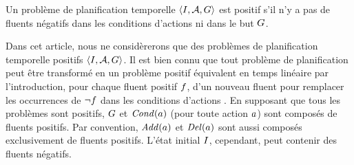 \begin{definition}
Un probl\`{e}me de planification temporelle $\langle I, \mathcal{A}, G \rangle$ est positif s'il n'y a pas de fluents n\'{e}gatifs dans les conditions d'actions ni dans le but $G$.
\end{definition}

Dans cet article, nous ne consid\`{e}rerons que des probl\`{e}mes de planification temporelle positifs $\langle I, \mathcal{A}, G \rangle$. Il est bien connu que tout probl\`{e}me de planification peut \^{e}tre transform\'{e} en un probl\`{e}me positif \'{e}quivalent en temps lin\'{e}aire par l'introduction, pour chaque fluent positif $f$, d'un nouveau fluent pour remplacer les occurrences de $\neg f$ dans les conditions d'actions \cite{DBLP:books/daglib/0014222}. %
En supposant que tous les probl\`{e}mes sont positifs, $G$ et $\mathit{Cond}(a)$ (pour toute action $a$) sont compos\'{e}s de fluents positifs. Par convention, $\mathit{Add}(a)$ et $\mathit{Del}(a)$ sont aussi compos\'{e}s exclusivement de fluents positifs. L'\'{e}tat initial $I$, cependant, peut contenir des fluents n\'{e}gatifs.




%
%
%





